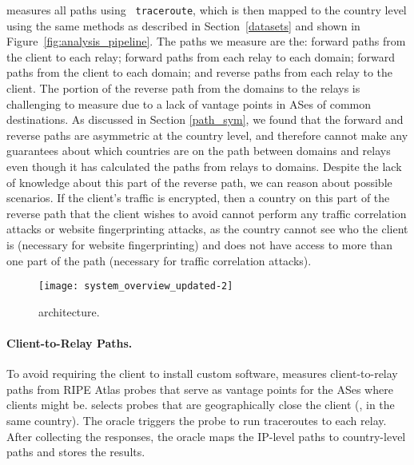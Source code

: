 \system{} measures all paths using {\tt 
traceroute}, which is then mapped to the country level using the same methods as 
described in Section~\ref{datasets} and shown in Figure~\ref{fig:analysis_pipeline}.
The paths we measure are the: forward paths from 
the client to each relay; forward paths from each relay to each domain; forward
paths from the client to each domain; and reverse paths from each relay to the 
client. 
The portion of the reverse path from the domains to the relays is
challenging to measure due to a lack of vantage points in ASes of common
destinations. As discussed in Section \ref{path_sym}, we found that  the
forward and reverse paths are asymmetric at the country level, and therefore
\system{} cannot make any guarantees about which countries are on the path
between  domains and relays even though it has calculated the paths from
relays to domains.   Despite the lack of knowledge about this part of the
reverse path,  we can reason about possible scenarios.  If the client's
traffic is encrypted, then a country on this part of
the reverse path that the client wishes to avoid cannot perform any  traffic correlation
attacks or website
fingerprinting attacks, as the country cannot see who the client is (necessary
for website fingerprinting) and does not have access to more than one part of
the path (necessary for traffic correlation attacks).

\begin{figure}[t!]
    \centering
        \texttt{[image: system\_overview\_updated-2]}
        \caption{\system{} architecture.}
        \label{fig:arch}
\end{figure}


\paragraph{Client-to-Relay Paths.} 
To avoid requiring the client to install custom software, \system{}
measures client-to-relay paths from RIPE Atlas probes that serve as 
vantage points for the ASes where \system{} clients might be.  \system{} selects
probes that
are geographically close the client (\eg, in the same 
country). The oracle triggers the probe to run traceroutes
to each relay.  After collecting the responses, the oracle maps 
the IP-level paths to country-level paths and stores the results.

